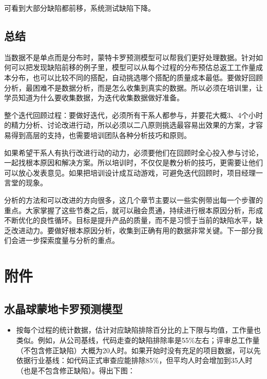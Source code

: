 可看到大部分缺陷都前移，系统测试缺陷下降。

\hypertarget{ux603bux7ed3}{%
\subsection{总结}\label{ux603bux7ed3}}

当数据不是单点而是分布时，蒙特卡罗预测模型可以帮我们更好处理数据。针对如何可以把发现缺陷前移的例子里，模型可以从每个过程的分布预估总返工工作量成本分布，也可以比较不同的搭配，自动挑选哪个搭配的质量成本最低。要做好回顾分析，最困难不是数据分析，而是怎么收集到真实的数据。所以必须在培训里，让学员知道为什么要收集数据，为迭代收集数据做好准备。

整个迭代回顾过程：要做好迭代，必须所有干系人都参与，并要花大概3、4个小时的精力分析、讨论改进行动，所以必须以二八原则挑选最容易出效果的方案，才容易得到高层的支持，也需要培训团队各种分析技巧和原则。

如果希望干系人有执行改进行动的动力，必须要他们在回顾时全心投入参与讨论，一起找根本原因和解决方案。所以培训时，不仅仅是教分析的技巧，更需要让他们可以放心发表意见。如果把培训设计成互动游戏，可避免迭代回顾时，项目经理一言堂的现象。

分析的方法和可以改进的方向很多，这几个章节主要以一些实例带出每一个步骤的重点。大家掌握了这些节奏之后，就可以融会贯通，持续进行根本原因分析，形成不断优化的良性循环。目标是提升产品的质量，而不是习惯于当前的缺陷水平，缺乏改进动力。要做好根本原因分析，收集到正确有用的数据非常关键。下一部分我们会进一步探索度量与分析的重点。

\hypertarget{ux9644ux4ef6}{%
\section{附件}\label{ux9644ux4ef6}}

\hypertarget{ux6c34ux6676ux7403ux8499ux5730ux5361ux7f57ux9884ux6d4bux6a21ux578b}{%
\subsection{水晶球蒙地卡罗预测模型}\label{ux6c34ux6676ux7403ux8499ux5730ux5361ux7f57ux9884ux6d4bux6a21ux578b}}

\begin{itemize}
\tightlist
\item
  按每个过程的统计数据，估计对应缺陷排除百分比的上下限与均值，工作量也类似。例如，从公司基线，代码走查的缺陷排除率是55\%左右；评审总工作量（不包含修正缺陷）大概为20人时。如果开始时没有充足的项目数据，可以先依据行业基线：如代码正式审查应能排除85\%，但平均人时会增加到35人时
  （也是不包含修正缺陷）。得出下图：
\end{itemize}

